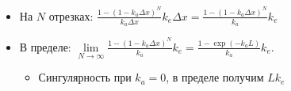 \documentclass{beamer}
\begin{document}
\begin{frame}[fragile]
\begin{itemize}
\pause
\item На \begin{math}N\end{math} отрезках: \begin{math}\frac{1 - (1 - k_a \Delta x)^N}{k_a \Delta x} k_e \Delta x = \frac{1 - (1 - k_a \Delta x)^N}{k_a} k_e\end{math}
\pause
\item В пределе: \begin{math}\lim\limits_{N \rightarrow \infty} \frac{1 - (1 - k_a \Delta x)^N}{k_a} k_e = \frac{1 - \exp(-k_a L)}{k_a} k_e\end{math}.
\pause
\begin{itemize}
\item Сингулярность при \begin{math}k_a = 0\end{math}, в пределе получим \begin{math}L k_e\end{math}
\end{itemize}
\end{itemize}
\end{frame}
\end{document}
